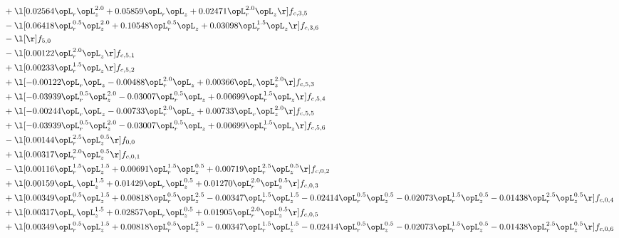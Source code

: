 \begin{alignat}{2}
& + \l[  0.02564 \opL_r \opL_z^{2.0} +  0.05859 \opL_r \opL_z +  0.02471 \opL_r^{2.0} \opL_z  \r] f_{c,3,5} \nonumber \\ 
& - \l[  0.06418 \opL_r^{0.5} \opL_z^{2.0} +  0.10548 \opL_r^{0.5} \opL_z +  0.03098 \opL_r^{1.5} \opL_z  \r] f_{c,3,6} \nonumber \\ 
& - \l[  \r] f_{5,0} \nonumber \\ 
& - \l[  0.00122 \opL_r^{2.0} \opL_z  \r] f_{c,5,1} \nonumber \\ 
& + \l[  0.00233 \opL_r^{1.5} \opL_z  \r] f_{c,5,2} \nonumber \\ 
& + \l[  -0.00122 \opL_r \opL_z   -0.00488 \opL_r^{2.0} \opL_z +  0.00366 \opL_r \opL_z^{2.0}  \r] f_{c,5,3} \nonumber \\ 
& + \l[  -0.03939 \opL_r^{0.5} \opL_z^{2.0}   -0.03007 \opL_r^{0.5} \opL_z +  0.00699 \opL_r^{1.5} \opL_z  \r] f_{c,5,4} \nonumber \\ 
& + \l[  -0.00244 \opL_r \opL_z   -0.00733 \opL_r^{2.0} \opL_z +  0.00733 \opL_r \opL_z^{2.0}  \r] f_{c,5,5} \nonumber \\ 
& + \l[  -0.03939 \opL_r^{0.5} \opL_z^{2.0}   -0.03007 \opL_r^{0.5} \opL_z +  0.00699 \opL_r^{1.5} \opL_z  \r] f_{c,5,6} \nonumber \\ 
& - \l[  0.00144 \opL_r^{2.5} \opL_z^{0.5}  \r] f_{0,0} \nonumber \\ 
& + \l[  0.00317 \opL_r^{2.0} \opL_z^{0.5}  \r] f_{c,0,1} \nonumber \\ 
& - \l[  0.00116 \opL_r^{1.5} \opL_z^{1.5} +  0.00691 \opL_r^{1.5} \opL_z^{0.5} +  0.00719 \opL_r^{2.5} \opL_z^{0.5}  \r] f_{c,0,2} \nonumber \\ 
& + \l[  0.00159 \opL_r \opL_z^{1.5} +  0.01429 \opL_r \opL_z^{0.5} +  0.01270 \opL_r^{2.0} \opL_z^{0.5}  \r] f_{c,0,3} \nonumber \\ 
& + \l[  0.00349 \opL_r^{0.5} \opL_z^{1.5} +  0.00818 \opL_r^{0.5} \opL_z^{2.5}   -0.00347 \opL_r^{1.5} \opL_z^{1.5}   -0.02414 \opL_r^{0.5} \opL_z^{0.5}   -0.02073 \opL_r^{1.5} \opL_z^{0.5}   -0.01438 \opL_r^{2.5} \opL_z^{0.5}  \r] f_{c,0,4} \nonumber \\ 
& + \l[  0.00317 \opL_r \opL_z^{1.5} +  0.02857 \opL_r \opL_z^{0.5} +  0.01905 \opL_r^{2.0} \opL_z^{0.5}  \r] f_{c,0,5} \nonumber \\ 
& + \l[  0.00349 \opL_r^{0.5} \opL_z^{1.5} +  0.00818 \opL_r^{0.5} \opL_z^{2.5}   -0.00347 \opL_r^{1.5} \opL_z^{1.5}   -0.02414 \opL_r^{0.5} \opL_z^{0.5}   -0.02073 \opL_r^{1.5} \opL_z^{0.5}   -0.01438 \opL_r^{2.5} \opL_z^{0.5}  \r] f_{c,0,6} \nonumber \\ 

\end{alignat}
